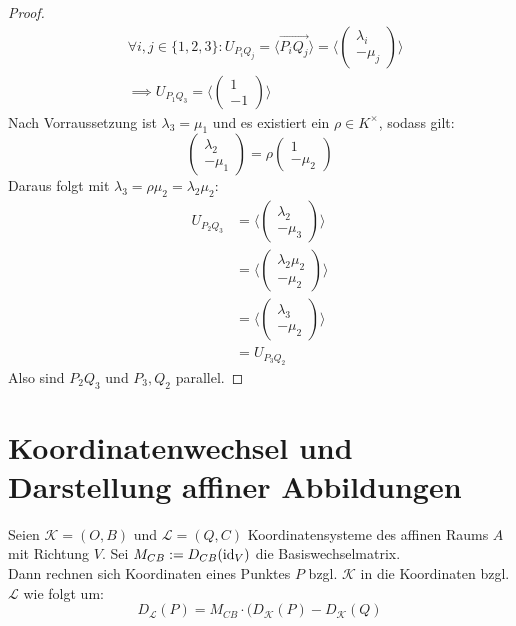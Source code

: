 \documentclass[parskip,a4paper,twoside,DIV15,BCOR12mm]{scrbook}
\begin{document}
\begin{proof}
\begin{align*}
&\forall i,j\in \{1,2,3\}:U_{P_iQ_j}=\langle\overrightarrow{P_iQ_j}\rangle =\langle 
\begin{pmatrix}\lambda_i\\-\mu_j\end{pmatrix}\rangle\\
&\implies U_{P_1Q_3}=\langle \begin{pmatrix}1\\-1\end{pmatrix}\rangle
\end{align*}
Nach Vorraussetzung ist $\lambda_3=\mu_1$ und es existiert ein $\rho\in K^\times$, sodass gilt:
\[ \begin{pmatrix}\lambda_2\\-\mu_1 \end{pmatrix}=\rho\begin{pmatrix}1\\-\mu_2\end{pmatrix}\]
Daraus folgt mit $\lambda_3=\rho\mu_2=\lambda_2\mu_2$:
\begin{align*}
U_{P_2Q_3}&=\langle \begin{pmatrix}\lambda_2 \\-\mu_3 \end{pmatrix}\rangle\\
&=\langle \begin{pmatrix} \lambda_2\mu_2\\-\mu_2 \end{pmatrix}\rangle\\
&=\langle \begin{pmatrix} \lambda_3\\-\mu_2 \end{pmatrix}\rangle\\
&= U_{P_3Q_2}
\end{align*}
Also sind $P_2Q_3$ und $P_3,Q_2$ parallel.
\end{proof}

\section{Koordinatenwechsel und Darstellung affiner Abbildungen}
\begin{lemma}
Seien $\mathcal{K}=(O,B)$ und $\mathcal{L}=(Q,C)$ Koordinatensysteme des affinen Raums
$A$ mit Richtung $V$. Sei $M_{CB}:=D_{CB}(\operatorname{id}_V)$ die Basiswechselmatrix.\\
Dann rechnen sich Koordinaten eines Punktes $P$ bzgl. $\mathcal{K}$ in die
Koordinaten bzgl. $\mathcal{L}$ wie folgt um:
\[D_\mathcal{L}(P)=M_{CB}\cdot(D_\mathcal{K}(P)-D_\mathcal{K}(Q)\]
\end{lemma}
\end{document}
